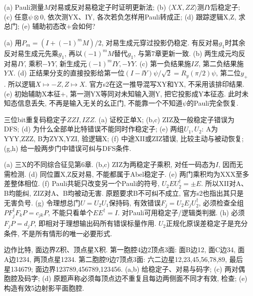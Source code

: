 \begin{exercise}(a) Pauli测量$M$对易或反对易稳定子时证明更新法; (b) $\langle XX,ZZ\rangle$测$IY$后稳定子; (c) 任意$\psi\otimes0$, 依次测YX、IY, 各次若负怎样用Pauli转成正; (d) 跟踪逻辑X,Z, 求总门; (e) 辅助初态改$+$会如何?\end{exercise}
\begin{solution}(a) 用$P_m=(I+(-1)^mM)/2$, 对易生成元穿过投影仍稳定. 有反对易$g_1$时其余反对易生成元先乘$g_1$, 再以$(-1)^mM$替代$g_1$, 与第7章更新一致. (b) 两生成元均反对易$IY$, 乘积$-YY$, 新生成元$(-1)^mIY,-YY$. (c) 第一负结果施$IZ$, 第二负结果施$YX$. (d) 正结果分支的直接投影给第一位$(I-\ii Y)\psi/\sqrt2=R_y(\pi/2)\psi$, 第二位$y_+$. 所以逻辑$X\mapsto-Z,Z\mapsto X$. 官方s2在这一推导混写XY和YX, 不采用该排印结果. (e) 初始辅助X本征+, 第一测YX等同对未知输入测Y, 把它投影成Y本征态. 此时未知态信息丢失, 不再是输入无关的幺正门, 不能靠一个不知道$\psi$的Pauli完全恢复.
\end{solution}
\begin{exercise}三位bit重复码稳定子$ZZI,IZZ$. (a) 证校正单X; (b,c) ZIZ及一般稳定子错误为DFS; (d) 为什么全部单比特错误不能同时作稳定子; (e) 两组$U_1,U_2$: A为YYY,ZZZ, B为ZYX,YZI, 验逻辑X; (f) 中途XII或ZIZ错误, 比较主动与被动恢复; (g,h) 给一般两步门中错误可纠与DFS条件.\end{exercise}
\begin{solution}(a) 三X的不同综合征见第6章. (b,c) ZIZ为两稳定子乘积, 对任一码态为$I$, 因而无需检测. (d) 同位置X,Z反对易, 不能都属于Abel稳定子. (e) 两门乘积均为XXX至多差整体相位. (f) Pauli共轭只改变另一个Pauli的符号, $U_2EU_2^\dagger=\pm E$. 所以XII对A、B均能纠, ZIZ对A、B均被动无害. 原题要求B不可纠不成立, 官方s2也指出其只是无害负号. (g) 令理想总门$U=U_2U_1$保持码, 有效错误$F_j=U_2E_jU_2^\dagger$, 必须检查全组$PF_j^\dagger F_kP=c_{jk}P$, 不能只看单个$EE^\dagger=I$. 对Pauli可用稳定子/逻辑类判据. (h) 必须$F_jP=d_jP$, 即相对于理想输出码所有错误标量作用. $U_2$正规化原误差稳定子是充分条件, 不是所有情形的唯一必要形式.
\end{solution}
\begin{exercise}边作比特, 面边界Z积、顶点星X积. 第一胞腔4边2顶点3面: 面B边12, 面C边34, 面A边1234, 两顶点星1234. 第二胞腔9边7顶点3面: 六二边星12,23,45,56,78,89, 最后星134679; 面边界123789,456789,123456. (a,b) 给稳定子、对易与码字; (c) 两对偶胞腔及码字; (d) 原题声称必须每顶点边不重复且每边两侧面不同才有效, 检查; (e) 构造有效5边射影平面胞腔.\end{exercise}
